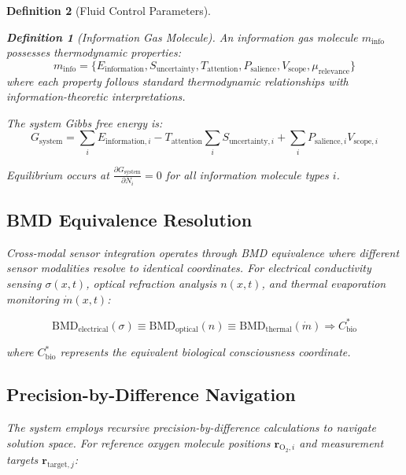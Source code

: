 \documentclass[12pt,a4paper]{article}
\newtheorem{definition}{Definition}
\begin{document}
\begin{definition}[Fluid Control Parameters]
\begin{definition}[Information Gas Molecule]
An information gas molecule $m_{\text{info}}$ possesses thermodynamic properties:
\begin{equation}
m_{\text{info}} = \{E_{\text{information}}, S_{\text{uncertainty}}, T_{\text{attention}}, P_{\text{salience}}, V_{\text{scope}}, \mu_{\text{relevance}}\}
\end{equation}
where each property follows standard thermodynamic relationships with information-theoretic interpretations.
\end{definition}

The system Gibbs free energy is:
\begin{equation}
G_{\text{system}} = \sum_{i} E_{\text{information},i} - T_{\text{attention}} \sum_{i} S_{\text{uncertainty},i} + \sum_{i} P_{\text{salience},i} V_{\text{scope},i}
\end{equation}

Equilibrium occurs at $\frac{\partial G_{\text{system}}}{\partial N_i} = 0$ for all information molecule types $i$.

\subsection{BMD Equivalence Resolution}

Cross-modal sensor integration operates through BMD equivalence where different sensor modalities resolve to identical coordinates. For electrical conductivity sensing $\sigma(x,t)$, optical refraction analysis $n(x,t)$, and thermal evaporation monitoring $\dot{m}(x,t)$:

\begin{equation}
\text{BMD}_{\text{electrical}}(\sigma) \equiv \text{BMD}_{\text{optical}}(n) \equiv \text{BMD}_{\text{thermal}}(\dot{m}) \Rightarrow C^*_{\text{bio}}
\end{equation}

where $C^*_{\text{bio}}$ represents the equivalent biological consciousness coordinate.

\subsection{Precision-by-Difference Navigation}

The system employs recursive precision-by-difference calculations to navigate solution space. For reference oxygen molecule positions $\mathbf{r}_{\text{O}_2,i}$ and measurement targets $\mathbf{r}_{\text{target},j}$:


\end{definition}
\end{document}

